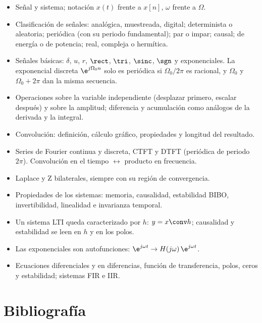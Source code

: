 \documentclass[11pt,a4paper]{scrartcl}
\begin{document}
\begin{itemize}
  \item Señal y sistema; notación $x(t)$ frente a $x[n]$, $\omega$ frente a $\Omega$.
  \item Clasificación de señales: analógica, muestreada, digital; determinista o aleatoria; periódica (con su periodo fundamental); par o impar; causal; de energía o de potencia; real, compleja o hermítica.
  \item Señales básicas: $\delta$, $u$, $r$, $\rect$, $\tri$, $\sinc$, $\sgn$ y exponenciales. La exponencial discreta $\e^{j\Omega_0n}$ solo es periódica si $\Omega_0/2\pi$ es racional, y $\Omega_0$ y $\Omega_0+2\pi$ dan la misma secuencia.
  \item Operaciones sobre la variable independiente (desplazar primero, escalar después) y sobre la amplitud; diferencia y acumulación como análogos de la derivada y la integral.
  \item Convolución: definición, cálculo gráfico, propiedades y longitud del resultado.
  \item Series de Fourier continua y discreta, CTFT y DTFT (periódica de periodo $2\pi$). Convolución en el tiempo $\leftrightarrow$ producto en frecuencia.
  \item Laplace y Z bilaterales, siempre con su región de convergencia.
  \item Propiedades de los sistemas: memoria, causalidad, estabilidad BIBO, invertibilidad, linealidad e invarianza temporal.
  \item Un sistema LTI queda caracterizado por $h$: $y=x\conv h$; causalidad y estabilidad se leen en $h$ y en los polos.
  \item Las exponenciales son autofunciones: $\e^{j\omega t}\to H(j\omega)\,\e^{j\omega t}$.
  \item Ecuaciones diferenciales y en diferencias, función de transferencia, polos, ceros y estabilidad; sistemas FIR e IIR.
\end{itemize}

\section*{Bibliografía}
\end{document}
